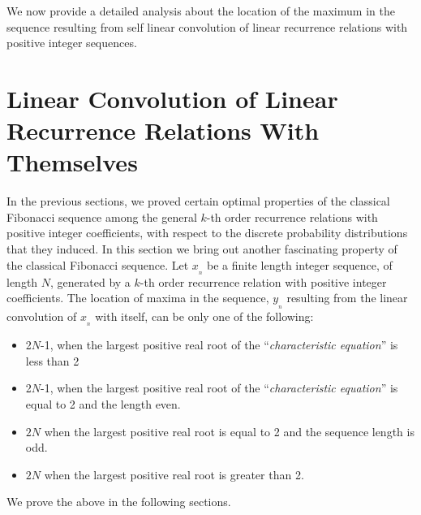 \begin{multicols}{2}
We now provide a detailed analysis about the location of the maximum in the sequence resulting from self linear convolution of linear recurrence relations with positive integer sequences.

\section{Linear Convolution of Linear\\ Recurrence Relations With\\ Themselves}\label{section-14}
In the previous sections, we proved certain optimal properties of the classical Fibonacci sequence among the general $k$-th order recurrence relations with positive integer coefficients, with respect to the discrete probability distributions that they induced. In this section we bring out another fascinating property of the classical Fibonacci sequence. Let $x_{_n}$ be a finite length integer sequence, of length $N$, generated by a $k$-th order recurrence relation with positive integer coefficients. The location of maxima in the sequence, $y_{_n}$ resulting from the linear convolution of $x_{_n}$ with itself, can be only one of the following:
\begin{itemize}
\item 2$N$-1, when the largest positive real root of the ``\textit{characteristic equation}'' is less than 2 
\item 2$N$-1, when the largest positive real root of the ``\textit{characteristic equation}'' is equal to  2 and the length even.
\item $2N$ when the largest positive real root is equal to 2 and the sequence length is odd.
\item $2N$ when the largest positive real root is greater than 2.
\end{itemize}
We prove the above in the following sections. 


\end{multicols}
